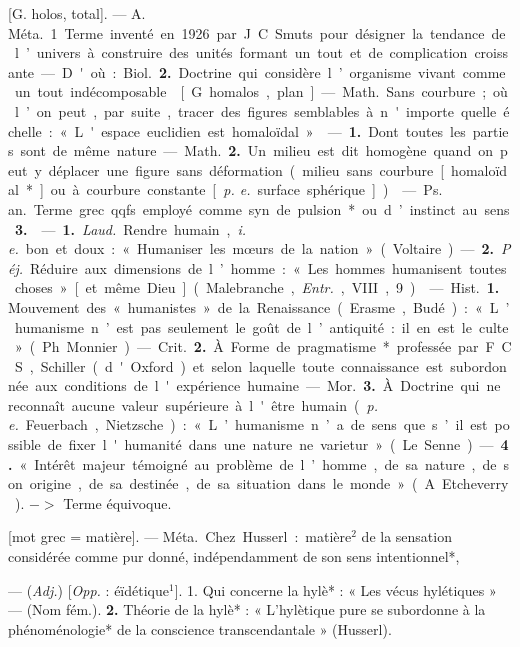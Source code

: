\begin{itemize}[leftmargin=1cm, label=, itemsep=1pt]
 [G. holos, total]. — A. \si{Méta.}
1. Terme inventé en 1926 par
J. C. Smuts pour désigner la tendance de l’univers à construire des
unités formant un tout et de complication croissante. — D'où : \si{Biol.}
 {\bf 2.} Doctrine qui considère l’organisme vivant comme un tout indécomposable.

 [G. homalos, plan]. —
\si{Math.} Sans courbure; où l’on peut,
par suite, tracer des figures semblables à n'importe quelle échelle :
« L'espace euclidien est homaloïdal».

 — {\bf 1.} Dont toutes les
parties sont de même nature.

— \si{Math.} {\bf 2.} Un milieu est dit
homogène quand on peut y déplacer
une figure sans déformation (milieu
sans courbure [homaloïdal*] ou
à courbure constante [{\it p. e.} surface
sphérique]).

 — \si{Ps. an.} Terme grec qqfs.
employé comme syn. de pulsion*
ou d’instinct au sens {\bf 3.}

 — {\bf 1.} {\it Laud.} Rendre humain,
{\it i. e.} bon et doux : « Humaniser
les mœurs de la nation » (Voltaire).
— {\bf 2.} {\it Péj.} Réduire aux dimensions
de l’homme : « Les hommes humanisent toutes choses» [et même
Dieu] (Malebranche, {\it Entr.}, VIII, 9).

 — \si{Hist.} {\bf 1.} Mouvement
des « humanistes » de la Renaissance (Erasme, Budé) : « L’humanisme n’est pas seulement le goût
de l’antiquité : il en est le culte »
(Ph. Monnier).

— \si{Crit.} {\bf 2.} À. Forme de pragmatisme* professée par F. C. S, Schiller
(d'Oxford) et selon laquelle toute
connaissance est subordonnée aux
conditions de l'expérience humaine.

— \si{Mor.} {\bf 3.} À. Doctrine qui ne
reconnaît aucune valeur supérieure
à l'être humain ({\it p. e.} Feuerbach,
Nietzsche) : « L’humanisme n’a de
sens que s’il est possible de fixer
l'humanité dans une nature ne
varietur » (Le Senne). — {\bf 4.} « Intérêt
majeur témoigné au problème de
l’homme, de sa nature, de son origine, de sa destinée, de sa situation
dans le monde » (A. Etcheverry).
$->$ Terme équivoque.

 [mot grec = matière]. — \si{Méta.}
Chez Husserl : matière$^2$ de la sensation considérée comme pur donné,
indépendamment de son sens intentionnel*,

 — ({\it Adj.}) [{\it Opp.} : éïdétique$^1$].
1. Qui concerne la hylè* : « Les vécus
hylétiques » — (Nom fém.). {\bf 2.}
Théorie de la hylè* : « L’hylètique
pure se subordonne à la phénoménologie* de la conscience transcendantale » (Husserl).


\end{itemize}
